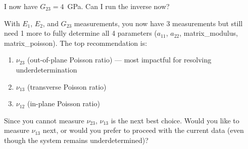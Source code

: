 \documentclass[preprint,review,10pt,number]{elsarticle}
\begin{document}
\begin{center}
\begin{tcolorbox}
\vspace{8pt}
\begin{tcolorbox}[
    breakable,
    colback=gray!8, colframe=gray!60, boxrule=0.5pt, arc=2pt,
    left=6pt, right=6pt, top=4pt, bottom=4pt,
    title={\textbf{User}}, fonttitle=\small\bfseries, coltitle=black
]
\small
I now have $G_{23}=4$~GPa. Can I run the inverse now?
\end{tcolorbox}
\vspace{4pt}
\begin{tcolorbox}[
    breakable,
    colback=gray!3, colframe=gray!40, boxrule=0.5pt, arc=2pt,
    left=6pt, right=6pt, top=4pt, bottom=4pt,
    title={\textbf{\texttt{MateriAl}} \hfill \texttt{\footnotesize\textcolor{gray!70!black}{\ding{110}\ check\_identifiability}}},
    fonttitle=\small\bfseries, coltitle=black
]
\small
With $E_1$, $E_2$, and $G_{23}$ measurements, you now have 3 measurements but still need 1 more to fully determine all 4 parameters ($a_{11}$, $a_{22}$, matrix\_modulus, matrix\_poisson). The top recommendation is:
\begin{enumerate}[leftmargin=1.4em, itemsep=1pt, topsep=2pt]
\item $\nu_{23}$ (out-of-plane Poisson ratio) --- most impactful for resolving underdetermination
\item $\nu_{13}$ (transverse Poisson ratio)
\item $\nu_{12}$ (in-plane Poisson ratio)
\end{enumerate}
Since you cannot measure $\nu_{23}$, $\nu_{13}$ is the next best choice. Would you like to measure $\nu_{13}$ next, or would you prefer to proceed with the current data (even though the system remains underdetermined)?
\end{tcolorbox}


\end{tcolorbox}
\end{center}
\end{document}

